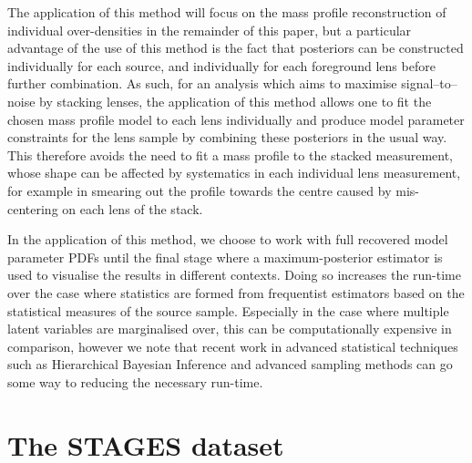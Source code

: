 \documentclass[useAMS,usenatbib,times,letter,amssymb]{mn2e}
\begin{document}
The application of this method will focus on the mass profile reconstruction of individual over-densities in the remainder of this paper, but a particular advantage of the use of this method is the fact that posteriors can be constructed individually for each source, and individually for each foreground lens before further combination. As such, for an analysis which aims to maximise signal--to--noise by stacking lenses, the application of this method allows one to fit the chosen mass profile model to each lens individually and produce model parameter constraints for the lens sample by combining these posteriors in the usual way. This therefore avoids the need to fit a mass profile to the stacked measurement, whose shape can be affected by systematics in each individual lens measurement, for example in smearing out the profile towards the centre caused by mis-centering on each lens of the stack.

In the application of this method, we choose to work with full recovered model parameter PDFs until the final stage where a maximum-posterior estimator is used to visualise the results in different contexts. Doing so increases the run-time over the case where statistics are formed from frequentist estimators based on the statistical measures of the source sample. Especially in the case where multiple latent variables are marginalised over, this can be computationally expensive in comparison, however we note that recent work in advanced statistical techniques such as Hierarchical Bayesian Inference \citep[e.g.][]{2015arXiv150507840A,2015ApJ...807...87S} and advanced sampling methods can go some way to reducing the necessary run-time.

\section{The STAGES dataset}\label{sec:STAGESDataset}
\end{document}
